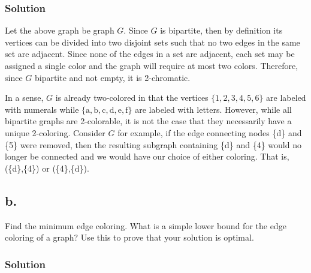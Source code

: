 \documentclass{amsart}
\begin{document}
\subsubsection*{Solution}
Let the above graph be graph $G$.
Since $G$ is bipartite, then by definition its vertices can be divided into two
disjoint sets such that no two edges in the same set are adjacent.
Since none of the edges in a set are adjacent, each set may be assigned a single
color and the graph will require at most two colors.
Therefore, since $G$ bipartite and not empty, it is 2-chromatic.
\begin{figure}[h]
\end{figure}

In a sense, $G$ is already two-colored in that the vertices $\{1,2,3,4,5,6\}$
are labeled with numerals while
$\{\text{a},\text{b},\text{c},\text{d},\text{e},\text{f}\}$
are labeled with letters.
However, while all bipartite graphs are 2-colorable, it is not the case that
they necessarily have a unique 2-coloring.
Consider $G$ for example, if the edge connecting nodes \{d\} and \{5\} were
removed, then the resulting subgraph containing \{d\} and \{4\} would
no longer be connected and we would have our choice of either coloring.
That is, (\{d\},\{4\}) or (\{4\},\{d\}).


\subsection*{b.}
Find the minimum edge coloring. What is a simple lower bound for the edge coloring of a
graph? Use this to prove that your solution is optimal.
\subsubsection*{Solution}
\begin{figure}[h]
\end{figure}
\end{document}
